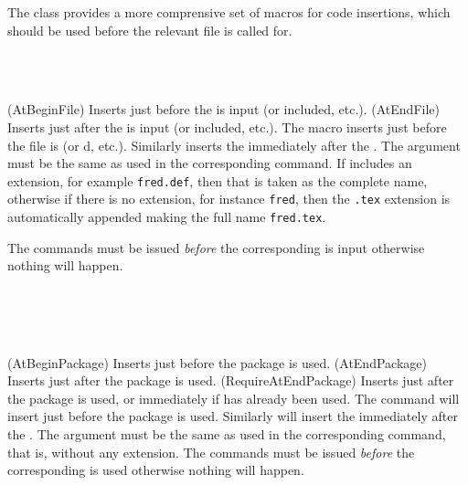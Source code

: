 The class provides a more comprensive set of macros for code 
insertions, which should be used before the relevant file is called for.

\begin{syntax}
\cmd{\AtBeginFile} \\
\cmd{\AtEndFile} \\
\end{syntax}
\glossary(AtBeginFile)%
  {}%
  {Inserts  just before the  is input 
   (or included, etc.).}%
\glossary(AtEndFile)%
  {}%
  {Inserts  just after the  is input 
   (or included, etc.).}%
The \cmd{\AtBeginFile} macro inserts  just before the 
file is \cmd{} (or \cmd{}d, etc.). Similarly
\cmd{\AtEndFile} inserts the  immediately after the 
. The  argument must be the same as used in the
corresponding \cmd{} command. If  includes an 
extension, for example \texttt{fred.def}, then that is taken as 
the complete name, otherwise if there is no extension, 
for instance \texttt{fred}, then the \texttt{.tex} extension is 
automatically appended making the full name \texttt{fred.tex}.

    The  commands 
must be issued \emph{before} the corresponding  is input 
otherwise nothing will happen.

\begin{syntax}
\cmd{\AtBeginPackage} \\
\cmd{\AtEndPackage} \\
\cmd{\RequireAtEndPackage} \\
\end{syntax}
\glossary(AtBeginPackage)%
  {}%
  {Inserts  just before the  package is used.}%
\glossary(AtEndPackage)%
  {}%
  {Inserts  just after the  package is used.}%
\glossary(RequireAtEndPackage)%
  {}%
  {Inserts  just after the  package is used,
  or immediately if  has already been used.}%
The \cmd{\AtBeginPackage} command will insert  just before the 
 package is used. Similarly
\cmd{\AtEndPackage} will insert the  immediately after the 
. The  argument must be the same as used in the
corresponding \cmd{\usepackage} command, that is, without any 
extension. The  commands 
must be issued \emph{before} the corresponding  is used
otherwise nothing will happen.

